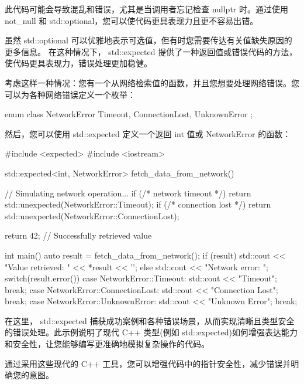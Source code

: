 此代码可能会导致混乱和错误，尤其是当调用者忘记检查 nullptr 时。通过使用 not\_null 和 std::optional，您可以使代码更具表现力且更不容易出错。


虽然 std::optional 可以优雅地表示可选值，但有时您需要传达有关值缺失原因的更多信息。
在这种情况下， std::expected 提供了一种返回值或错误代码的方法，使代码更具表现力，错误处理更加稳健。

考虑这样一种情况：您有一个从网络检索值的函数，并且您想要处理网络错误。您可以为各种网络错误定义一个枚举：

\begin{cpp}
enum class NetworkError {
    Timeout,
    ConnectionLost,
    UnknownError
};
\end{cpp}

然后，您可以使用 std::expected 定义一个返回 int 值或 NetworkError 的函数：

\begin{cpp}
#include <expected>
#include <iostream>

std::expected<int, NetworkError> fetch_data_from_network() {
    // Simulating network operation...
    if (/* network timeout */) {
        return std::unexpected(NetworkError::Timeout);
    }
    if (/* connection lost */) {
        return std::unexpected(NetworkError::ConnectionLost);
    }

    return 42; // Successfully retrieved value
}

int main() {
    auto result = fetch_data_from_network();
    if (result) {
        std::cout << "Value retrieved: " << *result << '\n';
    } else {
        std::cout << "Network error: ";
        switch(result.error()) {
            case NetworkError::Timeout:
                std::cout << "Timeout\n";
                break;
            case NetworkError::ConnectionLost:
                std::cout << "Connection Lost\n";
                break;
            case NetworkError::UnknownError:
                std::cout << "Unknown Error\n";
                break;
        }
    }
}
\end{cpp}

在这里， std::expected 捕获成功案例和各种错误场景，从而实现清晰且类型安全的错误处理。此示例说明了现代 C++ 类型(例如 std::expected)如何增强表达能力和安全性，让您能够编写更准确地模拟复杂操作的代码。

通过采用这些现代的 C++ 工具，您可以增强代码中的指针安全性，减少错误并明确您的意图。








































